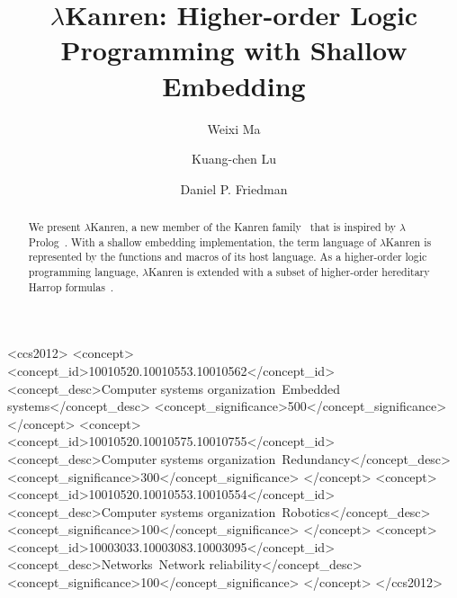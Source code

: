 \documentclass[acmlarge,review]{acmart}
\title{$\lambda$Kanren: Higher-order Logic Programming with Shallow Embedding}
\theoremstyle{definition}
\begin{document}

\author{Weixi Ma}
\author{Kuang-chen Lu}
\author{Daniel P. Friedman}


\begin{abstract}
  We present $\lambda$Kanren, a new member of the Kanren
family~\citep{friedman_reasoned_2018}
that is inspired by $\lambda$Prolog~\citep{miller_programming_2012}.
With a shallow embedding implementation, the term language of $\lambda$Kanren
is represented by the functions and macros of its host language. As a
higher-order logic programming language, $\lambda$Kanren is extended with
a subset of higher-order hereditary Harrop formulas~\citep{miller_uniform_1991}.
\end{abstract}
\begin{CCSXML}
<ccs2012>
 <concept>
  <concept_id>10010520.10010553.10010562</concept_id>
  <concept_desc>Computer systems organization~Embedded systems</concept_desc>
  <concept_significance>500</concept_significance>
 </concept>
 <concept>
  <concept_id>10010520.10010575.10010755</concept_id>
  <concept_desc>Computer systems organization~Redundancy</concept_desc>
  <concept_significance>300</concept_significance>
 </concept>
 <concept>
  <concept_id>10010520.10010553.10010554</concept_id>
  <concept_desc>Computer systems organization~Robotics</concept_desc>
  <concept_significance>100</concept_significance>
 </concept>
 <concept>
  <concept_id>10003033.10003083.10003095</concept_id>
  <concept_desc>Networks~Network reliability</concept_desc>
  <concept_significance>100</concept_significance>
 </concept>
</ccs2012>
\end{CCSXML}
\end{document}
